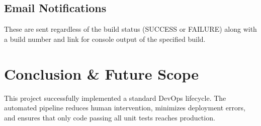 \documentclass[12pt,a4paper]{article}
\begin{document}
\subsection*{Email Notifications}

These are sent regardless of the build status (SUCCESS or FAILURE) along with a build number and link for console output of the specified build.


\section*{Conclusion \& Future Scope}

This project successfully implemented a standard DevOps lifecycle. The automated pipeline reduces human intervention, minimizes deployment errors, and ensures that only code passing all unit tests reaches production.
\end{document}
